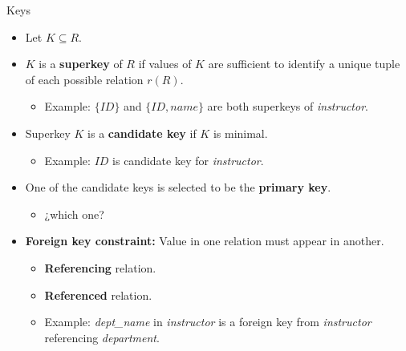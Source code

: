 \documentclass{beamer}
\begin{document}
\begin{frame}{Keys}
    \begin{itemize}
        \item Let $K \subseteq R$.
        \item $K$ is a \textbf{superkey} of $R$ if values of $K$ are sufficient to identify a unique tuple of each possible relation $r(R)$.
        \begin{itemize}
            \item Example: $\{ID\}$ and $\{ID, name\}$ are both superkeys of \textit{instructor}. 
        \end{itemize}
        \item Superkey $K$ is a \textbf{candidate key} if $K$ is minimal.
        \begin{itemize}
            \item Example: ${ID}$ is candidate key for \textit{instructor}. 
        \end{itemize}
        \item One of the candidate keys is selected to be the \textbf{primary key}.
        \begin{itemize}
            \item ¿which one? 
        \end{itemize}
        \item \textbf{Foreign key constraint:} Value in one relation must appear in another.
        \begin{itemize}
            \item \textbf{Referencing} relation.
            \item \textbf{Referenced} relation.
            \item Example: \textit{dept\_name} in \textit{instructor} is a foreign key from \textit{instructor} referencing \textit{department}.
        \end{itemize}
    \end{itemize}
\end{frame}
\end{document}
